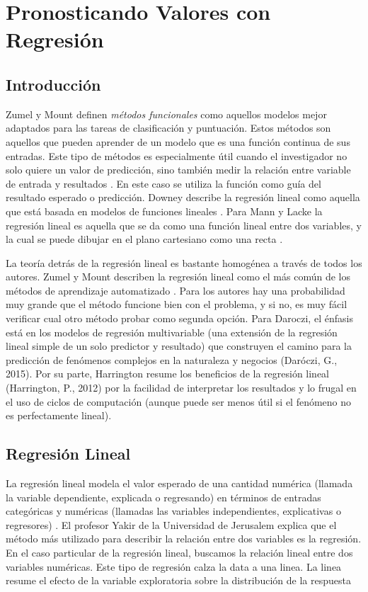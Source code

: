 \documentclass[letterpaper, spanish, 11pt]{report}
\begin{document}
	
\chapter*{Pronosticando Valores con Regresión}
	
\section{Introducción}
Zumel y Mount definen \emph{métodos funcionales} como aquellos modelos mejor adaptados para las tareas de clasificación y puntuación. Estos métodos son aquellos que pueden aprender de un modelo que es una función continua de sus entradas. Este tipo de métodos es especialmente útil cuando el investigador no solo quiere un valor de predicción, sino también medir la relación entre variable de entrada y resultados \cite{zumelMount}. En este caso se utiliza la función como guía del resultado esperado o predicción. Downey describe la regresión lineal como aquella que está basada en modelos de funciones lineales \cite{thinkStats}. Para Mann y Lacke la regresión lineal es aquella que se da como una función lineal entre dos variables, y la cual se puede dibujar en el plano cartesiano como una recta \cite{intoStats7}. 
  
La teoría detrás de la regresión lineal es bastante homogénea a través de todos los autores. Zumel y Mount describen la regresión lineal como el más común de los métodos de aprendizaje automatizado \cite{zumelMount}. Para los autores hay una probabilidad muy grande que el método funcione bien con el problema, y si no, es muy fácil verificar cual otro método probar como segunda opción. Para Daroczi, el énfasis está en los modelos de regresión multivariable (una extensión de la regresión lineal simple de un solo predictor y resultado) que construyen el camino para la predicción de fenómenos complejos en la naturaleza y negocios (Daróczi, G., 2015). Por su parte, Harrington resume los beneficios de la regresión lineal (Harrington, P., 2012) por la facilidad de interpretar los resultados y lo frugal en el uso de ciclos de computación (aunque puede ser menos útil si el fenómeno no es perfectamente lineal).

\section{Regresión Lineal}
La regresión lineal modela el valor esperado de una cantidad numérica (llamada la variable dependiente, explicada o regresando) en términos de entradas categóricas y numéricas (llamadas las variables independientes, explicativas o regresores) \cite{zumelMount}. El profesor Yakir de la Universidad de Jerusalem explica que el método más utilizado para describir la relación entre dos variables es la regresión. En el caso particular de la regresión lineal, buscamos la relación lineal entre dos variables numéricas. Este tipo de regresión calza la data a una linea. La linea resume el efecto de la variable exploratoria sobre la distribución de la respuesta \cite{yakir}
\end{document}
